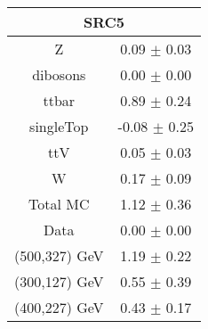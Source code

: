 \begin{tabular}{c|c}
\hline\hline
\multicolumn{2}{c}{\bf SRC5 } \\ \hline 
Z & 0.09 $\pm$ 0.03 \\
dibosons & 0.00 $\pm$ 0.00 \\
ttbar & 0.89 $\pm$ 0.24 \\
singleTop & -0.08 $\pm$ 0.25 \\
ttV & 0.05 $\pm$ 0.03 \\
W & 0.17 $\pm$ 0.09 \\
\hline
Total MC & 1.12 $\pm$ 0.36 \\
Data & 0.00 $\pm$ 0.00 \\
\hline
(500,327) GeV & 1.19 $\pm$ 0.22\\
\hline
 (300,127) GeV & 0.55 $\pm$ 0.39  \\
\hline
 (400,227) GeV & 0.43 $\pm$ 0.17 \\
\hline\hline
\end{tabular}
